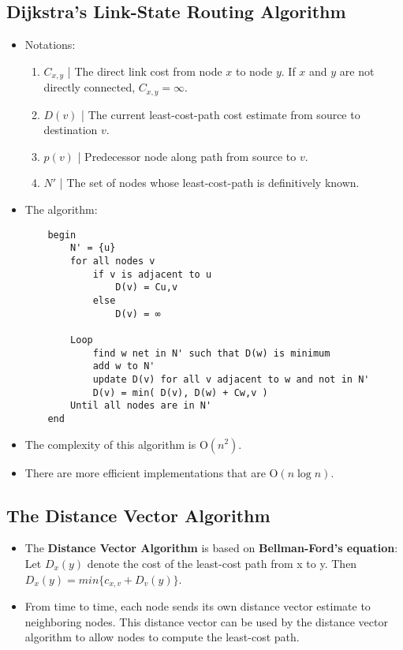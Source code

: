 \documentclass{article}
\begin{document}
    \subsection*{Dijkstra's Link-State Routing Algorithm}
    \begin{itemize}
        \item Notations:
        \begin{enumerate}
            \item $C_{x,y}$ | The direct link cost from node $x$ to node $y$. If $x$ and $y$ are not directly connected, $C_{x,y}=\infty$.
            \item $D(v)$ | The current least-cost-path cost estimate from source to destination $v$.
            \item $p(v)$ | Predecessor node along path from source to $v$.
            \item $N'$ | The set of nodes whose least-cost-path is definitively known.
        \end{enumerate}
        \item The algorithm:
        \begin{verbatim}
    begin
        N' = {u}
        for all nodes v
            if v is adjacent to u
                D(v) = Cu,v
            else
                D(v) = ∞
        
        Loop
            find w net in N' such that D(w) is minimum
            add w to N'
            update D(v) for all v adjacent to w and not in N'
            D(v) = min( D(v), D(w) + Cw,v )
        Until all nodes are in N'
    end
        \end{verbatim}
        \item The complexity of this algorithm is $\text{O}(n^2)$.
        \item There are more efficient implementations that are $\text{O}(n\log{n})$.
    \end{itemize}

    \subsection*{The Distance Vector Algorithm}
    \begin{itemize}
        \item The \textbf{Distance Vector Algorithm} is based on \textbf{Bellman-Ford's equation}: Let $D_x(y)$ denote the cost of the least-cost path from x to y. Then $D_x(y)=min\{c_{x,v} + D_v(y)\}$.
        \item From time to time, each node sends its own distance vector estimate to neighboring nodes. This distance vector can be used by the distance vector algorithm to allow nodes to compute the least-cost path.
    \end{itemize}
\end{document}
